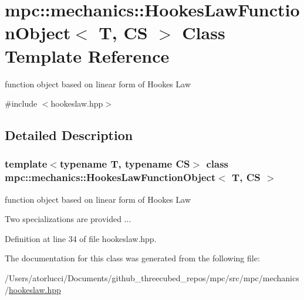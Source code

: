 \hypertarget{structmpc_1_1mechanics_1_1_hookes_law_function_object}{}\section{mpc\+:\+:mechanics\+:\+:Hookes\+Law\+Function\+Object$<$ T, CS $>$ Class Template Reference}
\label{structmpc_1_1mechanics_1_1_hookes_law_function_object}


function object based on linear form of Hooke\textquotesingle{}s Law  




{\ttfamily \#include $<$hookeslaw.\+hpp$>$}



\subsection{Detailed Description}
\subsubsection*{template$<$typename T, typename CS$>$\newline
class mpc\+::mechanics\+::\+Hookes\+Law\+Function\+Object$<$ T, C\+S $>$}

function object based on linear form of Hooke\textquotesingle{}s Law 

Two specializations are provided ... 

Definition at line 34 of file hookeslaw.\+hpp.



The documentation for this class was generated from the following file\+:\begin{DoxyCompactItemize}
\item 
/\+Users/atorlucci/\+Documents/github\+\_\+threecubed\+\_\+repos/mpc/src/mpc/mechanics/\mbox{\hyperlink{hookeslaw_8hpp}{hookeslaw.\+hpp}}\end{DoxyCompactItemize}
